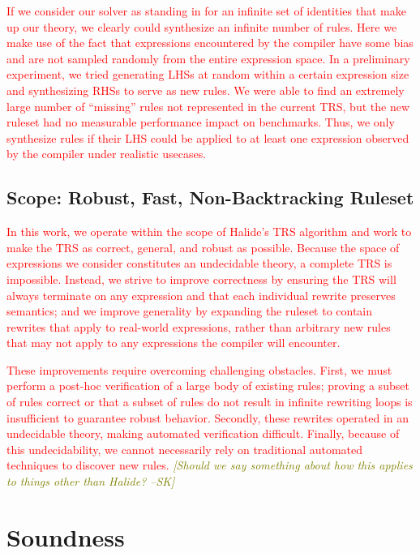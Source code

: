 \documentclass[acmsmall,review]{acmart}\settopmatter{printfolios=true,printccs=false,printacmref=false}
\newcommand{\sak}[1]{\textcolor{olive}{\textit{[{#1} --SK]}}}
\newcommand{\modified}[1]{\textcolor{red}{{#1}}}
\begin{document}
\modified{If we consider our solver as standing in for an infinite set of identities that make up
our theory, we clearly could synthesize an infinite number of rules. Here we make use
of the fact that expressions encountered by the compiler have some bias 
and are not sampled randomly from the entire expression space. In a preliminary 
experiment, we tried generating LHSs at random within a certain expression size and 
synthesizing RHSs to serve as new rules. We were able to find an extremely large number of 
``missing'' rules not represented in the current TRS, but the new ruleset had 
no measurable performance impact on benchmarks. Thus, we only synthesize rules if their LHS could be 
applied to at least one expression observed by the compiler under realistic usecases. %
}

\subsection{Scope: Robust, Fast, Non-Backtracking Ruleset}
\modified{In this work, we operate within the scope of Halide's TRS algorithm
  and work to make the TRS as correct, general, and robust as possible.  Because
  the space of expressions we consider constitutes an undecidable theory, a complete
  TRS is impossible.  Instead, we strive to improve correctness by ensuring the TRS
  will always terminate on any expression and that each individual rewrite
  preserves semantics; and we improve generality by expanding the ruleset to
  contain rewrites that apply to real-world expressions, rather than
  arbitrary new rules that may not apply to any expressions the compiler will encounter.}

\modified{These improvements require overcoming challenging obstacles.  First,
  we must perform a post-hoc verification of a large body of existing rules;
  proving a subset of rules correct or that a subset of rules do not result in infinite
  rewriting loops is insufficient to guarantee robust behavior.  Secondly,
  these rewrites operated in an undecidable theory, making automated verification
  difficult.  Finally, because of this undecidability, we cannot necessarily
  rely on traditional automated techniques to discover new rules.}
\sak{Should we say something about how this applies to things other than Halide?}

\section{Soundness}
\label{sec:soundness}
\end{document}
